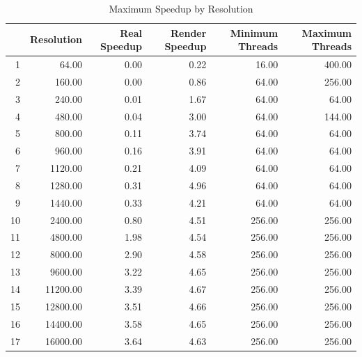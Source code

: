 \documentclass[12pt]{article}
\begin{document}
\begin{center}
\begin{table}[ht]
\begin{center}
\begin{tabular}{rrrrrr}
  \hline
 & Resolution & Real Speedup & Render Speedup & Minimum Threads & Maximum Threads \\ 
  \hline
1 & 64.00 & 0.00 & 0.22 & 16.00 & 400.00 \\ 
  2 & 160.00 & 0.00 & 0.86 & 64.00 & 256.00 \\ 
  3 & 240.00 & 0.01 & 1.67 & 64.00 & 64.00 \\ 
  4 & 480.00 & 0.04 & 3.00 & 64.00 & 144.00 \\ 
  5 & 800.00 & 0.11 & 3.74 & 64.00 & 64.00 \\ 
  6 & 960.00 & 0.16 & 3.91 & 64.00 & 64.00 \\ 
  7 & 1120.00 & 0.21 & 4.09 & 64.00 & 64.00 \\ 
  8 & 1280.00 & 0.31 & 4.96 & 64.00 & 64.00 \\ 
  9 & 1440.00 & 0.33 & 4.21 & 64.00 & 64.00 \\ 
  10 & 2400.00 & 0.80 & 4.51 & 256.00 & 256.00 \\ 
  11 & 4800.00 & 1.98 & 4.54 & 256.00 & 256.00 \\ 
  12 & 8000.00 & 2.90 & 4.58 & 256.00 & 256.00 \\ 
  13 & 9600.00 & 3.22 & 4.65 & 256.00 & 256.00 \\ 
  14 & 11200.00 & 3.39 & 4.67 & 256.00 & 256.00 \\ 
  15 & 12800.00 & 3.51 & 4.66 & 256.00 & 256.00 \\ 
  16 & 14400.00 & 3.58 & 4.65 & 256.00 & 256.00 \\ 
  17 & 16000.00 & 3.64 & 4.63 & 256.00 & 256.00 \\ 
   \hline
\end{tabular}
\caption{Maximum Speedup by Resolution}
\label{tab:max_speedup_each_res}
\end{center}
\end{table}\end{center}
\end{document}
